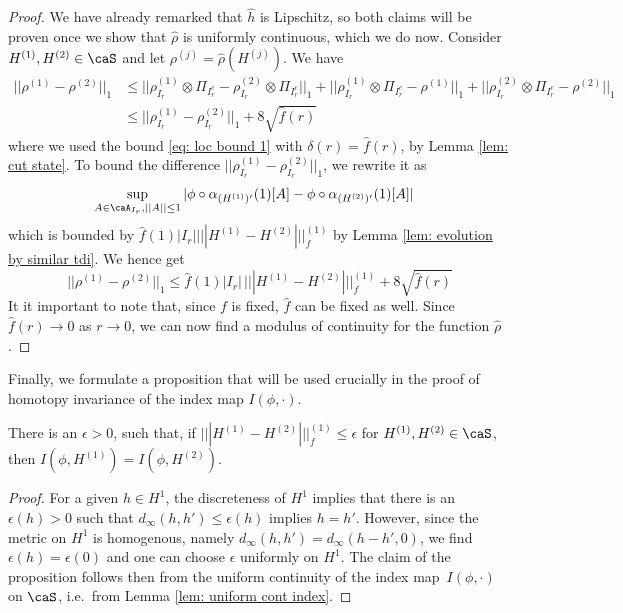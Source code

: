 \begin{proof}
	We have already remarked that $\hat{h}$ is Lipschitz, so both claims will be proven once we show that $\hat{\rho}$ is uniformly continuous, which we do now. 
	Consider $H^{(1)},H^{(2)}\in \caS$ and let $\rho^{(j)}=\hat{\rho}(H^{(j)})$.
	We have
	\begin{align*}
		||\rho^{(1)}-\rho^{(2)}||_1  &\leq    ||\rho^{(1)}_{I_r} \otimes\Pi_{I_r^c}-\rho^{(2)}_{I_r}\otimes\Pi_{I_r^c}||_1 +  ||\rho^{(1)}_{I_r}\otimes\Pi_{I_r^c}-\rho^{(1)}||_1  +   ||\rho^{(2)}_{I_r}\otimes\Pi_{I_r^c}-\rho^{(2)}||_1 \\
		&\leq  ||\rho^{(1)}_{I_r} -\rho^{(2)}_{I_r}||_1   +  8\sqrt{\hat{f}(r)}
	\end{align*}
	where we used the bound \eqref{eq: loc bound 1} with $\delta(r)=\hat{f}(r)$, by Lemma \ref{lem: cut state}. 
	To bound  the difference
	$||\rho^{(1)}_{I_r} -\rho^{(2)}_{I_r}||_1 $, we rewrite it as
	\begin{align}
		&\sup_{A \in \caA_{I_r}, ||A||\leq 1} |\phi\circ\alpha_{(H^{(1)})'}(1)[A]-\phi\circ\alpha_{(H^{(2)})'}(1)[A]| 
	\end{align}
	which is bounded by $ \hat{f}(1)|I_r| |||H^{(1)}-H^{(2)}|||^{(1)}_f   $ by Lemma \ref{lem: evolution by similar tdi}. 
	We hence get 
	$$
	||\rho^{(1)}-\rho^{(2)}||_1 \leq    \hat{f}(1)|I_r|\, |||H^{(1)}-H^{(2)}|||^{(1)}_f +   8 \sqrt{\hat f(r)}        
	$$
	It it important to note that, since $f$ is fixed, $\hat{f}$ can be fixed as well.  Since $\hat f(r) \to 0$ as $r\to 0$, we can now find a modulus of continuity for the function $\hat{\rho}$.
\end{proof}


Finally, we formulate a proposition that will be used crucially in the proof of homotopy invariance of the index map $I(\phi,\cdot)$. 
\begin{proposition}\label{prop: finite index set}
	There is an $ \epsilon>0$, such that, if $|||H^{(1)}-H^{(2)}|||^{(1)}_f \leq \epsilon$ for $H^{(1)}, H^{(2)}\in\caS$, then $I(\phi,H^{(1)})=I(\phi,H^{(2)})$. 
\end{proposition}
\begin{proof}
	For a given $h\in H^1$, the discreteness of $H^1$ implies that there is an $\epsilon(h)>0$ such that
	$d_{\infty}(h,h')\leq \epsilon(h)$ implies $h=h'$.  However, since the metric on $H^1$ is homogenous, namely $d_{\infty}(h,h') = d_{\infty}(h-h',0)$, we find  $\epsilon(h)=\epsilon(0)$ and one can choose $\epsilon$ uniformly on $H^1$.  The claim of the proposition follows then from the uniform continuity of the index map~$I(\phi,\cdot)$ on $\caS$, i.e.\ from Lemma \ref{lem: uniform cont index}. 
\end{proof}












